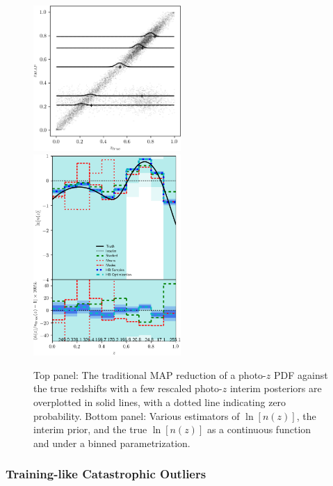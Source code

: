 \documentclass[iop]{emulateapj}
\begin{document}
\begin{figure}
	\begin{center}
		
\includegraphics[width=0.5\textwidth]{fig/template_outliers/scatter.png}\\
		
\includegraphics[width=0.5\textwidth]{fig/template_outliers/estimators.png}	
	
		\caption{Top panel: The traditional MAP reduction of a 
photo-$z$ PDF against the true redshifts with a few rescaled photo-$z$ interim 
posteriors are overplotted in solid lines, with a dotted line indicating zero 
probability.  Bottom panel: Various estimators of $\ln[n(z)]$, the interim 
prior, and the true $\ln[n(z)]$ as a continuous function and under a binned 
parametrization.}
		\label{fig:tempcatout}
	\end{center}
\end{figure}

\subsubsection{Training-like Catastrophic Outliers}
\label{sec:traincatout}
\end{document}
